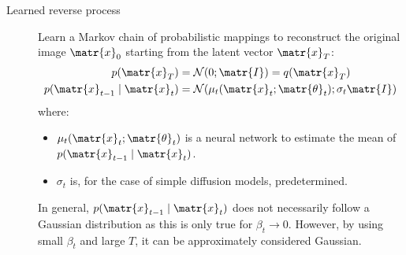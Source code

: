 \begin{description}
    \item[Learned reverse process] 
        Learn a Markov chain of probabilistic mappings to reconstruct the original image $\matr{x}_0$ starting from the latent vector $\matr{x}_T$:
        \[
            \begin{split}
                p(\matr{x}_T) &= \mathcal{N}(0; \matr{I}) = q(\matr{x}_T) \\
                p(\matr{x}_{t-1} \mid \matr{x}_t) &= \mathcal{N}(\mu_t(\matr{x}_t; \matr{\theta}_t); \sigma_t\matr{I})
            \end{split}
        \]
        where:
        \begin{itemize}
            \item $\mu_t(\matr{x}_t; \matr{\theta}_t)$ is a neural network to estimate the mean of $p(\matr{x}_{t-1} \mid \matr{x}_t)$.
            \item $\sigma_t$ is, for the case of simple diffusion models, predetermined.
        \end{itemize}

        \begin{remark}
            In general, $p(\matr{x}_{t-1} \mid \matr{x}_t)$ does not necessarily follow a Gaussian distribution as this is only true for $\beta_t \rightarrow 0$. However, by using small $\beta_t$ and large $T$, it can be approximately considered Gaussian.
        \end{remark}


\end{description}
